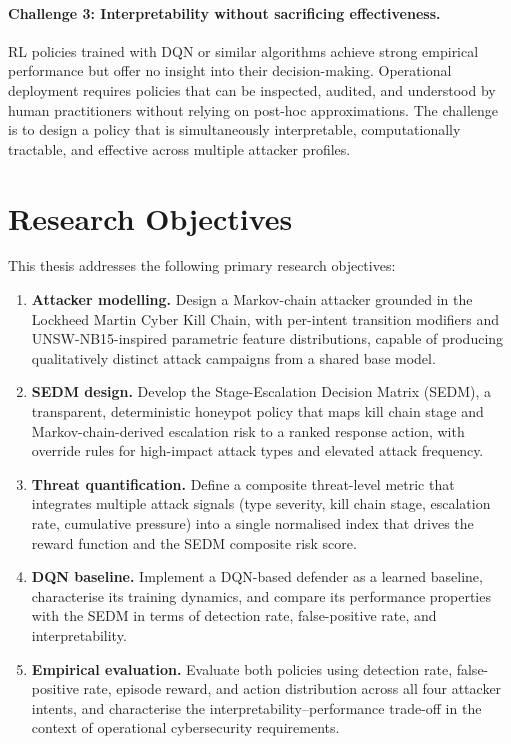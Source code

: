 \paragraph{Challenge 3: Interpretability without sacrificing effectiveness.}
RL policies trained with DQN or similar algorithms achieve strong empirical
performance but offer no insight into their decision-making.
Operational deployment requires policies that can be inspected, audited, and
understood by human practitioners without relying on post-hoc approximations.
The challenge is to design a policy that is simultaneously interpretable,
computationally tractable, and effective across multiple attacker profiles.

\section{Research Objectives}

This thesis addresses the following primary research objectives:

\begin{enumerate}
  \item \textbf{Attacker modelling.}
        Design a Markov-chain attacker grounded in the Lockheed Martin
        Cyber Kill Chain, with per-intent transition modifiers and
        UNSW-NB15-inspired parametric feature distributions, capable of
        producing qualitatively distinct attack campaigns from a shared
        base model.

  \item \textbf{SEDM design.}
        Develop the Stage-Escalation Decision Matrix (SEDM), a
        transparent, deterministic honeypot policy that maps kill chain
        stage and Markov-chain-derived escalation risk to a ranked
        response action, with override rules for high-impact attack types
        and elevated attack frequency.

  \item \textbf{Threat quantification.}
        Define a composite threat-level metric that integrates multiple
        attack signals (type severity, kill chain stage, escalation rate,
        cumulative pressure) into a single normalised index that drives
        the reward function and the SEDM composite risk score.

  \item \textbf{DQN baseline.}
        Implement a DQN-based defender as a learned baseline, characterise
        its training dynamics, and compare its performance properties
        with the SEDM in terms of detection rate, false-positive rate,
        and interpretability.

  \item \textbf{Empirical evaluation.}
        Evaluate both policies using detection rate, false-positive rate,
        episode reward, and action distribution across all four attacker
        intents, and characterise the interpretability--performance
        trade-off in the context of operational cybersecurity requirements.
\end{enumerate}

